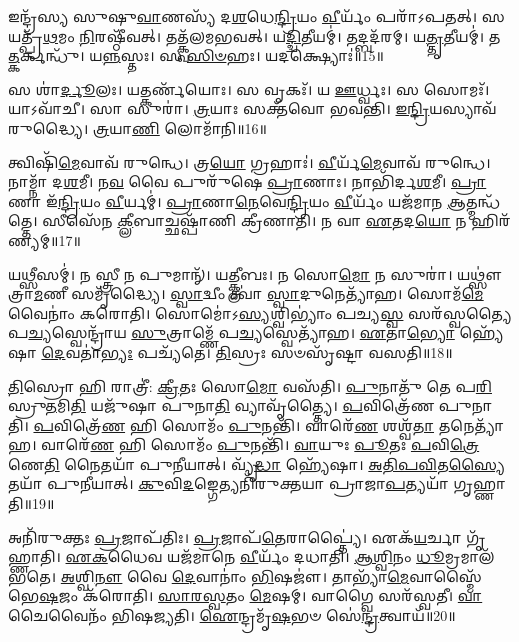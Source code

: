 𑌇𑌨𑍍𑌦𑍍𑌰᳴𑌸𑍍𑌯 𑌸𑍁𑌷𑍁\-\ul{𑌵𑌾}\-𑌣𑌸𑍍𑌯᳴ 𑌦\-\ul{𑌶}\-𑌧𑍇\-\ul{𑌨𑍍𑌦𑍍𑌰𑌿}\-𑌯𑌂 \ul{𑌵𑍀}\-𑌰𑍍𑌯𑌂᳴ 𑌪𑌰𑌾᳴\-𑌽𑌪𑌤𑌤𑍍।
𑌸 𑌯𑌤𑍍𑌪𑍍𑌰᳴\-\ul{𑌥}\-𑌮𑌂 \ul{𑌨𑌿}\-𑌰𑌷𑍍𑌠𑍀᳴𑌵𑌤𑍍।
𑌤𑌤𑍍𑌕𑍍𑌵᳴𑌲𑌮𑌭𑌵𑌤𑍍।
𑌯\-\ul{𑌦𑍍𑌦𑍍𑌵𑌿}\-𑌤𑍀𑌯𑌮𑍍॑।
𑌤𑌦𑍍𑌬𑌦᳴𑌰𑌮𑍍।
𑌯\-\ul{𑌤𑍍𑌤𑍃}\-𑌤𑍀𑌯𑌮𑍍॑।
𑌤\-\ul{𑌤𑍍𑌕}\-𑌰𑍍𑌕𑌨𑍍𑌧𑍁᳴।
𑌯\-\ul{𑌨𑍍𑌨}\-𑌸𑍍𑌤𑌃।
𑌸 \ul{𑌸𑌿}\-\-\ul{𑍞}\-𑌹𑌃।
𑌯𑌦𑌕𑍍𑌷𑍍𑌯𑍋𑌃॑॥15॥

𑌸 𑌶𑌾॑\-\ul{𑌰𑍍𑌦𑍂}\-𑌲𑌃।
𑌯𑌤𑍍𑌕𑌰𑍍𑌣᳴𑌯𑍋𑌃।
𑌸 𑌵𑍃𑌕𑌃᳴।
𑌯 \ul{𑌊}\-𑌰𑍍𑌧𑍍𑌵𑌃।
𑌸 𑌸𑍋𑌮𑌃᳴।
𑌯𑌾𑌽𑌵𑌾᳴𑌚𑍀।
𑌸𑌾 𑌸𑍁𑌰𑌾॑।
\-\ul{𑌤𑍍𑌰}\-𑌯𑌾𑌃 𑌸𑌕𑍍𑌤᳴𑌵𑍋 𑌭𑌵𑌨𑍍𑌤𑌿।
\-\ul{𑌇}\-\-\ul{𑌨𑍍𑌦𑍍𑌰𑌿}\-𑌯𑌸𑍍𑌯𑌾𑌵᳴𑌰𑍁𑌦𑍍𑌧𑍍𑌯𑍈।
\-\ul{𑌤𑍍𑌰}\-𑌯𑌾\-\ul{𑌣𑌿} 𑌲𑍋𑌮𑌾᳴𑌨𑌿॥16॥

𑌤𑍍𑌵𑌿𑌷𑌿᳴\-\ul{𑌮𑍇}\-𑌵𑌾𑌵᳴ 𑌰𑍁𑌨𑍍𑌧𑍇।
𑌤𑍍𑌰\-\ul{𑌯𑍋} 𑌗𑍍𑌰𑌹𑌾𑌃॑।
\-\ul{𑌵𑍀}\-𑌰𑍍𑌯᳴\-\ul{𑌮𑍇}\-𑌵𑌾𑌵᳴ 𑌰𑍁𑌨𑍍𑌧𑍇।
𑌨𑌾𑌮𑍍𑌨𑌾᳴ 𑌦\-\ul{𑌶}\-𑌮𑍀।
𑌨\-\ul{𑌵} 𑌵𑍈 𑌪𑍁𑌰𑍁᳴𑌷𑍇 \ul{𑌪𑍍𑌰𑌾}\-𑌣𑌾𑌃।
𑌨𑌾𑌭𑌿᳴𑌰𑍍𑌦\-\ul{𑌶}\-𑌮𑍀।
\-\ul{𑌪𑍍𑌰𑌾}\-𑌣𑌾 𑌇᳴\-\ul{𑌨𑍍𑌦𑍍𑌰𑌿}\-𑌯𑌂 \ul{𑌵𑍀}\-𑌰𑍍𑌯𑌮𑍍॑।
\-\ul{𑌪𑍍𑌰𑌾}\-𑌣𑌾\-\ul{𑌨𑍇}\-𑌵𑍇\-\ul{𑌨𑍍𑌦𑍍𑌰𑌿}\-𑌯𑌂 \ul{𑌵𑍀}\-𑌰𑍍𑌯𑌂᳴ 𑌯𑌜᳴𑌮𑌾𑌨 \ul{𑌆}\-𑌤𑍍𑌮𑌨𑍍𑌧᳴𑌤𑍍𑌤𑍇।
𑌸𑍀𑌸𑍇᳴𑌨 \ul{𑌕𑍍𑌲𑍀}\-𑌬𑌾𑌚𑍍𑌛𑌷𑍍𑌪𑌾᳴𑌣𑌿 𑌕𑍍𑌰𑍀𑌣𑌾𑌤𑌿।
𑌨 𑌵𑌾 \ul{𑌏}\-𑌤𑌦\-\ul{𑌯𑍋} 𑌨 𑌹𑌿𑌰᳴𑌣𑍍𑌯𑌮𑍍॥17॥

𑌯𑌥𑍍𑌸𑍀𑌸𑌮𑍍॑।
𑌨 𑌸𑍍𑌤𑍍𑌰𑍀 𑌨 𑌪𑍁𑌮𑌾𑌨𑍍᳴।
𑌯\-\ul{𑌤𑍍𑌕𑍍𑌲𑍀}\-𑌬𑌃।
𑌨 𑌸𑍋\-\ul{𑌮𑍋} 𑌨 𑌸𑍁𑌰𑌾॑।
𑌯𑌥𑍍𑌸𑍗॑𑌤𑍍𑌰𑌾\-\ul{𑌮}\-𑌣𑍀 𑌸𑌮𑍃᳴𑌦𑍍𑌧𑍍𑌯𑍈।
\-\ul{𑌸𑍍𑌵𑌾}\-𑌦𑍍𑌵𑍀𑌂 𑌤𑍍𑌵𑌾॑ \ul{𑌸𑍍𑌵𑌾}\-𑌦𑍁𑌨𑍇𑌤𑍍𑌯𑌾᳴𑌹।
𑌸𑍋𑌮᳴\-\ul{𑌮𑍇}\-𑌵𑍈𑌨𑌾𑌂॑ 𑌕𑌰𑍋𑌤𑌿।
𑌸𑍋𑌮𑍋॑\-𑌽\-\ul{𑌸𑍍𑌯}\-𑌶𑍍𑌵𑌿𑌭𑍍𑌯𑌾𑌂॑ 𑌪𑌚𑍍𑌯\-\ul{𑌸𑍍𑌵} 𑌸𑌰᳴𑌸𑍍𑌵𑌤𑍍𑌯𑍈 𑌪\-\ul{𑌚𑍍𑌯}\-𑌸𑍍𑌵𑍇𑌨𑍍𑌦𑍍𑌰𑌾᳴𑌯 \ul{𑌸𑍁}\-𑌤𑍍𑌰𑌾𑌮𑍍𑌣𑍇᳴ 𑌪\-\ul{𑌚𑍍𑌯}\-𑌸𑍍𑌵𑍇𑌤𑍍𑌯𑌾᳴𑌹।
\-\ul{𑌏}\-𑌤𑌾\-\ul{𑌭𑍍𑌯𑍋} 𑌹𑍍𑌯𑍇᳴𑌷𑌾 \ul{𑌦𑍇}\-𑌵𑌤𑌾॑\-\ul{𑌭𑍍𑌯𑌃} 𑌪𑌚𑍍𑌯᳴𑌤𑍇।
\-\ul{𑌤𑌿}\-𑌸𑍍𑌰𑌃 𑌸𑍞𑌸𑍃᳴𑌷𑍍𑌟𑌾 𑌵𑌸𑌤𑌿॥18॥

\-\ul{𑌤𑌿}\-𑌸𑍍𑌰𑍋 𑌹𑌿 𑌰𑌾𑌤𑍍𑌰𑍀॑: \ul{𑌕𑍍𑌰𑍀}\-𑌤𑌃 𑌸𑍋\-\ul{𑌮𑍋} 𑌵𑌸᳴𑌤𑌿।
\-\ul{𑌪𑍁}\-𑌨𑌾𑌤𑍁᳴ 𑌤𑍇 𑌪\-\ul{𑌰𑌿}\-𑌸𑍍𑌰𑍁\-\ul{𑌤}\-𑌮𑌿\-\ul{𑌤𑌿} 𑌯𑌜𑍁᳴𑌷𑌾 𑌪𑍁𑌨𑌾\-\ul{𑌤𑌿} 𑌵𑍍𑌯𑌾𑌵𑍃᳴𑌤𑍍𑌤𑍍𑌯𑍈।
\-\ul{𑌪}\-𑌵𑌿𑌤𑍍𑌰𑍇᳴𑌣 𑌪𑍁𑌨𑌾𑌤𑌿।
\-\ul{𑌪}\-𑌵𑌿𑌤𑍍𑌰𑍇᳴\-\ul{𑌣} 𑌹𑌿 𑌸𑍋𑌮𑌂᳴ \ul{𑌪𑍁}\-𑌨𑌨𑍍𑌤𑌿᳴।
𑌵𑌾𑌰𑍇᳴\-\ul{𑌣} 𑌶𑌶𑍍𑌵᳴\-\ul{𑌤𑌾} 𑌤𑌨𑍇𑌤𑍍𑌯𑌾᳴𑌹।
𑌵𑌾𑌰𑍇᳴\-\ul{𑌣} 𑌹𑌿 𑌸𑍋𑌮𑌂᳴ \ul{𑌪𑍁}\-𑌨𑌨𑍍𑌤𑌿᳴।
\-\ul{𑌵𑌾}\-𑌯𑍁𑌃 \ul{𑌪𑍂}\-𑌤𑌃 \ul{𑌪}\-𑌵𑌿\-\ul{𑌤𑍍𑌰𑍇}\-𑌣𑍇\-\ul{𑌤𑌿} 𑌨𑍈𑌤𑌯𑌾᳴ 𑌪𑍁𑌨𑍀𑌯𑌾𑌤𑍍।
𑌵𑍍𑌯𑍃᳴\-\ul{𑌦𑍍𑌧𑌾} 𑌹𑍍𑌯𑍇᳴𑌷𑌾।
\-\ul{𑌅}\-\-\ul{𑌤𑌿}\-\-\ul{𑌪}\-\-\ul{𑌵𑌿}\-𑌤\-\ul{𑌸𑍍𑌯𑍈}\-𑌤𑌯𑌾᳴ 𑌪𑍁𑌨𑍀𑌯𑌾𑌤𑍍।
\-\ul{𑌕𑍁}\-𑌵𑌿\-\ul{𑌦}\-𑌙𑍍𑌗𑍇𑌤𑍍𑌯𑌨𑌿᳴𑌰𑍁𑌕𑍍𑌤𑌯𑌾 𑌪𑍍𑌰𑌾𑌜𑌾\-\ul{𑌪}\-𑌤𑍍𑌯𑌯𑌾᳴ 𑌗𑍃𑌹𑍍𑌣𑌾𑌤𑌿॥19॥

𑌅𑌨𑌿᳴𑌰𑍁𑌕𑍍𑌤𑌃 \ul{𑌪𑍍𑌰}\-𑌜𑌾\-𑌪᳴𑌤𑌿𑌃।
\-\ul{𑌪𑍍𑌰}\-𑌜𑌾𑌪᳴\-\ul{𑌤𑍇}\-𑌰𑌾𑌪𑍍𑌤𑍍𑌯𑍈॑।
𑌏𑌕᳴\-\ul{𑌯}\-𑌰𑍍𑌚𑌾 𑌗𑍃᳴𑌹𑍍𑌣𑌾𑌤𑌿।
\-\ul{𑌏}\-\-\ul{𑌕}\-𑌧𑍈𑌵 𑌯𑌜᳴𑌮𑌾𑌨𑍇 \ul{𑌵𑍀}\-𑌰𑍍𑌯𑌂᳴ 𑌦𑌧𑌾𑌤𑌿।
\-\ul{𑌆}\-\-\ul{𑌶𑍍𑌵𑌿}\-𑌨𑌂 \ul{𑌧𑍂}\-𑌮𑍍𑌰𑌮𑌾𑌲᳴𑌭𑌤𑍇।
\-\ul{𑌅}\-𑌶𑍍𑌵𑌿\-\ul{𑌨𑍗} 𑌵𑍈 \ul{𑌦𑍇}\-𑌵𑌾𑌨𑌾𑌂॑ \ul{𑌭𑌿}\-𑌷𑌜𑍗॑।
𑌤𑌾𑌭𑍍𑌯𑌾᳴\-\ul{𑌮𑍇}\-𑌵𑌾𑌸𑍍𑌮𑍈᳴ 𑌭𑍇\-\ul{𑌷}\-𑌜𑌂 𑌕᳴𑌰𑍋𑌤𑌿।
\-\ul{𑌸𑌾}\-\-\ul{𑌰}\-\-\ul{𑌸𑍍𑌵}\-𑌤𑌂 \ul{𑌮𑍇}\-𑌷𑌮𑍍।
𑌵𑌾𑌗𑍍𑌵𑍈 𑌸𑌰᳴𑌸𑍍𑌵𑌤𑍀।
\-\ul{𑌵𑌾}\-𑌚𑍈𑌵𑍈𑌨𑌂᳴ 𑌭𑌿𑌷𑌜𑍍𑌯𑌤𑌿।
\-\ul{𑌐}\-𑌨𑍍𑌦𑍍𑌰𑌮𑍃᳴\-\ul{𑌷}\-𑌭𑍞 𑌸𑍇॑\-\ul{𑌨𑍍𑌦𑍍𑌰}\-𑌤𑍍𑌵𑌾𑌯᳴॥20॥\anuvakamend[𑌅\-\ul{𑌕𑍍𑌷𑍍𑌯𑍋}\-𑌰𑍍𑌲𑍋𑌮𑌾᳴\-\ul{𑌨𑌿} 𑌹𑌿𑌰᳴𑌣𑍍𑌯𑌂 𑌵𑌸𑌤𑌿 𑌗𑍃𑌹𑍍𑌣𑌾𑌤𑌿 𑌭𑌿𑌷\-\ul{𑌜𑍍𑌯}\-𑌤𑍍𑌯𑍇𑌕𑌂᳴ 𑌚]

